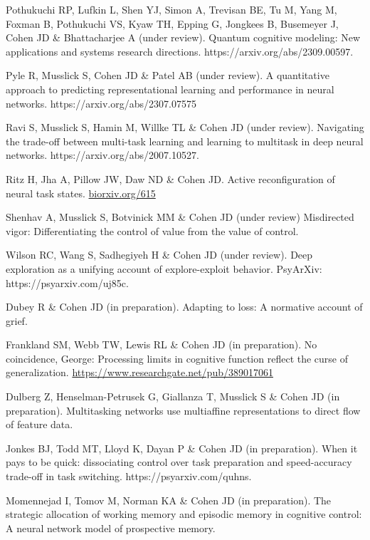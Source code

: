 \documentclass[10 pt]{article}
\begin{document}
Pothukuchi RP, Lufkin L, Shen YJ, Simon A, Trevisan BE, Tu M, Yang M, Foxman B, Pothukuchi VS, Kyaw TH, Epping G, Jongkees B, Busemeyer J, Cohen JD \& Bhattacharjee A (under review). Quantum cognitive modeling: New applications and systems research directions. https://arxiv.org/abs/2309.00597.

Pyle R, Musslick S, Cohen JD \& Patel AB (under review). A quantitative approach to predicting representational learning and performance in neural networks. https://arxiv.org/abs/2307.07575

Ravi S, Musslick S, Hamin M, Willke TL \& Cohen JD (under review). Navigating the trade-off between multi-task learning and learning to multitask in deep neural networks. https://arxiv.org/abs/2007.10527.

Ritz H, Jha A, Pillow JW, Daw ND \& Cohen JD. Active reconfiguration of neural task states. \href{https://www.biorxiv.org/content/10.1101/2024.09.29.615736v1}{biorxiv.org/615}

Shenhav A, Musslick S, Botvinick MM \& Cohen JD (under review) Misdirected vigor: Differentiating
the control of value from the value of control.

Wilson RC, Wang S, Sadhegiyeh H \& Cohen JD (under review). Deep exploration as a unifying account of explore-exploit behavior. PsyArXiv: https://psyarxiv.com/uj85c.

Dubey R \& Cohen JD (in preparation). Adapting to loss: A normative account of grief.

Frankland SM, Webb TW, Lewis RL \& Cohen JD (in preparation). No coincidence, George: Processing limits in cognitive function reflect the curse of generalization. \href{https://www.researchgate.net/publication/389017061_No_Coincidence_George_Processing_Limits_in_Cognitive_Function_Reflect_the_Curse_of_Generalization}
{https://www.researchgate.net/pub/389017061}

Dulberg Z, Henselman-Petrusek G, Giallanza T, Musslick S \& Cohen JD (in preparation). Multitasking networks use multiaffine representations to direct flow of feature data.

Jonkes BJ, Todd MT, Lloyd K, Dayan P \& Cohen JD (in preparation). When it pays to be quick: dissociating control over task preparation and speed-accuracy trade-off in task switching. https://psyarxiv.com/quhns.

Momennejad I, Tomov M, Norman KA \& Cohen JD (in preparation). The strategic allocation of working memory and episodic memory in cognitive control: A neural network model of prospective memory.
\end{document}
